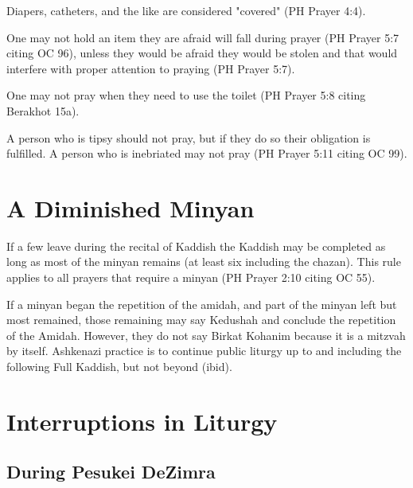 \documentclass[11pt]{article}
\begin{document}
Diapers, catheters, and the like are considered "covered" (PH Prayer 4:4).

One may not hold an item they are afraid will fall during prayer (PH Prayer 5:7 citing OC 96), unless they would be afraid they would be stolen and that would interfere with proper attention to praying (PH Prayer 5:7).

One may not pray when they need to use the toilet (PH Prayer 5:8 citing Berakhot 15a).

A person who is tipsy should not pray, but if they do so their obligation is fulfilled.  A person who is inebriated may not pray (PH Prayer 5:11 citing OC 99).

\section{A Diminished Minyan}

If a few leave during the recital of Kaddish the Kaddish may be completed as long as most of the minyan remains (at least six including the chazan). This rule applies to all prayers that require a minyan (PH Prayer 2:10 citing OC 55).

If a minyan began the repetition of the amidah, and part of the minyan left but most remained, those remaining may say Kedushah and conclude the repetition of the Amidah. However, they do not say Birkat Kohanim because it is a mitzvah by itself. Ashkenazi practice is to continue public liturgy up to and including the following Full Kaddish, but not beyond (ibid). 

\section{Interruptions in Liturgy}

\subsection{During Pesukei DeZimra}
\end{document}
